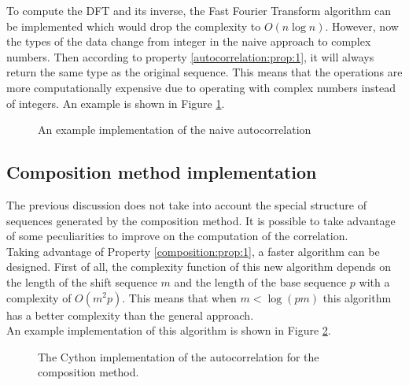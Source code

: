         To compute the DFT and its inverse, the Fast Fourier
        Transform\cite{fast_fourier_transform} algorithm can be implemented
        which would drop the complexity to $O(n \log n)$.  However, now the types
        of the data change from integer in the naive approach to complex
        numbers. Then according to property \ref{autocorrelation:prop:1}, it will
        always return the same type as the original sequence. This means that the
        operations are more computationally expensive due to operating with
        complex numbers instead of integers. An example is shown in Figure
        \ref{convolution_auto:fig:1}.\\

        \begin{figure}[ht!]
          \caption{An example implementation of the naive autocorrelation}
          \label{convolution_auto:fig:1}
        \end{figure}

      \subsection{Composition method implementation}

      The previous discussion does not take into account the special structure of
      sequences generated by the composition method. It is possible to take
      advantage of some peculiarities to improve on the computation of the
      correlation.\\

     Taking advantage of Property \ref{composition:prop:1}, a faster algorithm can
     be designed. First of all, the complexity function of this new algorithm
     depends on the length of the shift sequence $m$  and the length of the base
     sequence $p$ with a complexity of $O(m^2p)$. This means
     that when $m < \log(pm)$ this algorithm has a better complexity than the
     general approach.\\

     An example implementation of this algorithm is shown in Figure
     \ref{composite_auto:fig:1}.

     \begin{figure}[ht!]
       \caption{The Cython implementation of the autocorrelation for the composition method.}
       \label{composite_auto:fig:1}
     \end{figure}

